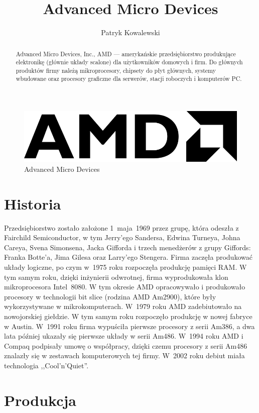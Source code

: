\documentclass[a4paper,12pt]{article}
\title{Advanced Micro Devices}
\author{Patryk Kowalewski}
\begin{document}
\maketitle

\begin{abstract}\noindent Advanced Micro Devices, Inc., AMD --- amerykańskie przedsiębiorstwo produkujące elektronikę (głównie układy scalone) dla użytkowników domowych i firm. Do głównych produktów firmy należą mikroprocesory, chipsety do płyt głównych, systemy wbudowane oraz procesory graficzne dla serwerów, stacji roboczych i komputerów PC.
\end{abstract}

\begin{figure}[h]
\centering
\includegraphics[width=0.3\hsize]{amd.png}
\caption{Advanced Micro Devices}\label{AMD}
\end{figure}

\section{Historia}

Przedsiębiorstwo zostało założone 1~maja~1969 przez grupę, która odeszła z Fairchild Semiconductor, w tym Jerry’ego Sandersa, Edwina Turneya, Johna Careya, Svena Simonsena, Jacka Gifforda i trzech menedżerów z grupy Giffords: Franka Botte’a, Jima Gilesa oraz Larry’ego Stengera. Firma zaczęła produkować układy logiczne, po czym w~1975 roku rozpoczęła produkcję pamięci RAM. W tym samym roku, dzięki inżynierii odwrotnej, firma wyprodukowała klon mikroprocesora Intel~8080. W tym okresie AMD opracowywało i produkowało procesory w technologii bit slice (rodzina AMD Am2900), które były wykorzystywane w mikrokomputerach. W~1979 roku AMD zadebiutowało na nowojorskiej giełdzie. W tym samym roku rozpoczęło produkcję w nowej fabryce w Austin.
W~1991 roku firma wypuściła pierwsze procesory z serii Am386, a dwa lata później ukazały się pierwsze układy w serii Am486. W~1994 roku AMD i Compaq podpisały umowę o współpracy, dzięki czemu procesory z serii Am486 znalazły się w zestawach komputerowych tej firmy. W~2002 roku debiut miała technologia ,,Cool’n'Quiet''.


\section{Produkcja}
\end{document}
